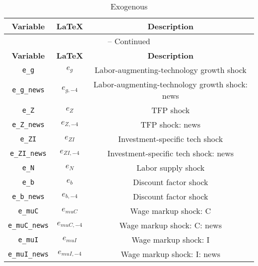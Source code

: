 \begin{center}
\begin{longtable}{ccc}
\caption{Exogenous}\\%
\hline%
\multicolumn{1}{c}{\textbf{Variable}} &
\multicolumn{1}{c}{\textbf{\LaTeX}} &
\multicolumn{1}{c}{\textbf{Description}}\\%
\hline\hline%
\endfirsthead
\multicolumn{3}{c}{{\tablename} \thetable{} -- Continued}\\%
\hline%
\multicolumn{1}{c}{\textbf{Variable}} &
\multicolumn{1}{c}{\textbf{\LaTeX}} &
\multicolumn{1}{c}{\textbf{Description}}\\%
\hline\hline%
\endhead
\texttt{e\_g} & ${e_g}$ & Labor-augmenting-technology growth shock\\
\texttt{e\_g\_news} & ${e_{g,-4}}$ & Labor-augmenting-technology growth shock: news\\
\texttt{e\_Z} & ${e_Z}$ & TFP shock\\
\texttt{e\_Z\_news} & ${e_{Z,-4}}$ & TFP shock: news\\
\texttt{e\_ZI} & ${e_{ZI}}$ & Investment-specific tech shock\\
\texttt{e\_ZI\_news} & ${e_{ZI,-4}}$ & Investment-specific tech shock: news\\
\texttt{e\_N} & ${e_N}$ & Labor supply shock\\
\texttt{e\_b} & ${e_b}$ & Discount factor shock\\
\texttt{e\_b\_news} & ${e_{b,-4}}$ & Discount factor shock\\
\texttt{e\_muC} & ${e_{muC}}$ & Wage markup shock: C\\
\texttt{e\_muC\_news} & ${e_{muC,-4}}$ & Wage markup shock: C: news\\
\texttt{e\_muI} & ${e_{muI}}$ & Wage markup shock: I\\
\texttt{e\_muI\_news} & ${e_{muI,-4}}$ & Wage markup shock: I: news\\
\hline%
\end{longtable}
\end{center}
